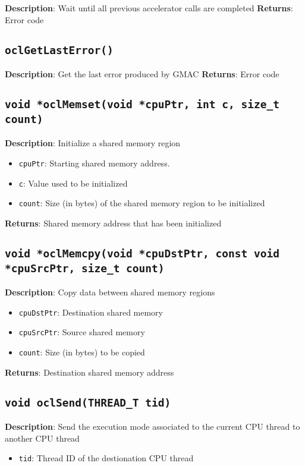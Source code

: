 \textbf{Description}: Wait until all previous accelerator calls are completed
\textbf{Returns}: Error code

\subsection{\texttt{oclGetLastError()}}

\textbf{Description}: Get the last error produced by GMAC
\textbf{Returns}: Error code

\subsection{\texttt{void *oclMemset(void *cpuPtr, int c, size\_t count)}}

\textbf{Description}: Initialize a shared memory region
\begin{itemize}
  \item \texttt{cpuPtr}: Starting shared memory address.
  \item \texttt{c}: Value used to be initialized
  \item \texttt{count}: Size (in bytes) of the shared memory region to be initialized
\end{itemize}
\textbf{Returns}: Shared memory address that has been initialized

\subsection{\texttt{void *oclMemcpy(void *cpuDstPtr, const void *cpuSrcPtr, size\_t count)}}

\textbf{Description}: Copy data between shared memory regions
\begin{itemize}
  \item \texttt{cpuDstPtr}: Destination shared memory
  \item \texttt{cpuSrcPtr}: Source shared memory
  \item \texttt{count}: Size (in bytes) to be copied
\end{itemize}
\textbf{Returns}: Destination shared memory address

\subsection{\texttt{void oclSend(THREAD\_T tid)}}

\textbf{Description}: Send the execution mode associated to the current CPU thread to another CPU thread
\begin{itemize}
  \item \texttt{tid}: Thread ID of the destionation CPU thread
\end{itemize}

